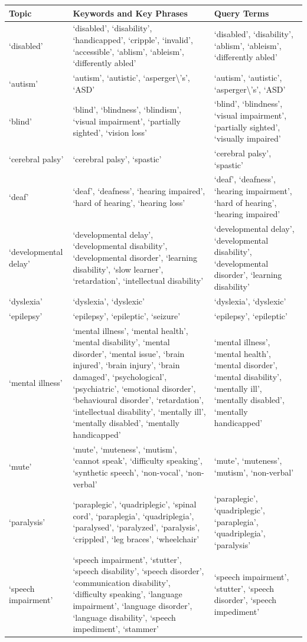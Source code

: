 \documentclass{report}
\begin{document}
\begin{longtabu} to \textwidth { | X[l] | X[l] | X[l] | } 
	\hline
	Topic & Keywords and Key Phrases & Query Terms \\ 
	\hline
	`disabled' & `disabled', `disability', `handicapped', `cripple', `invalid', `accessible', `ablism', `ableism', `differently abled' & `disabled', `disability', `ablism', `ableism', `differently abled' \\ 
	\hline
	`autism' & `autism', `autistic', `asperger\textbackslash's', `ASD' & `autism', `autistic', `asperger\textbackslash's', `ASD' \\ 
	\hline
	`blind' & `blind', `blindness', `blindism', `visual impairment', `partially sighted', `vision loss' & `blind', `blindness', `visual impairment', `partially sighted', `visually impaired' \\ 
	\hline
	`cerebral palsy' & `cerebral palsy', `spastic' & `cerebral palsy', `spastic' \\ 
	\hline
	`deaf' & `deaf', `deafness', `hearing impaired', `hard of hearing', `hearing loss' & `deaf', `deafness', `hearing impairment', `hard of hearing', `hearing impaired' \\ 
	\hline
	`developmental delay' & `developmental delay', `developmental disability', `developmental disorder', `learning disability', `slow learner', `retardation', `intellectual disability' & `developmental delay', `developmental disability', `developmental disorder', `learning disability' \\ 
	\hline
	`dyslexia' & `dyslexia', `dyslexic' & `dyslexia', `dyslexic' \\ 
	\hline
	`epilepsy' & `epilepsy', `epileptic', `seizure' & `epilepsy', `epileptic' \\ 
	\hline
	`mental illness' & `mental illness', `mental health', `mental disability', `mental disorder', `mental issue', `brain injured', `brain injury', `brain damaged', `psychological', `psychiatric', `emotional disorder', `behavioural disorder', `retardation', `intellectual disability', `mentally ill', `mentally disabled', `mentally handicapped' & `mental illness', `mental health', `mental disorder', `mental disability', `mentally ill', `mentally disabled', `mentally handicapped' \\ 
	\hline
	`mute' & `mute', `muteness', `mutism', `cannot speak', `difficulty speaking', `synthetic speech', `non-vocal', `non-verbal' & `mute', `muteness', `mutism', `non-verbal' \\ 
	\hline
	`paralysis' & `paraplegic', `quadriplegic', `spinal cord', `paraplegia', `quadriplegia', `paralysed', `paralyzed', `paralysis', `crippled', `leg braces', `wheelchair' & `paraplegic', `quadriplegic', `paraplegia', `quadriplegia', `paralysis' \\ 
	\hline
	`speech impairment' & `speech impairment', `stutter', `speech disability', `speech disorder', `communication disability', `difficulty speaking', `language impairment', `language disorder', `language disability', `speech impediment', `stammer' & `speech impairment', `stutter', `speech disorder', `speech impediment' \\ 
	\hline
\end{longtabu}
\end{document}
